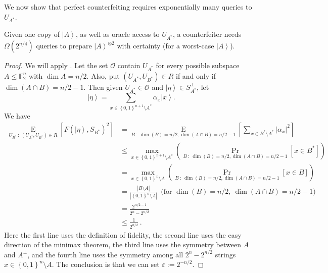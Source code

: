 We now show that perfect counterfeiting requires exponentially many queries to
$U_{A^{\ast}}$.

\begin{theorem}
\label{nocopyc}Given one copy of
$\left\vert A\right\rangle $, as well as oracle access to $U_{A^{\ast}}$, a
counterfeiter needs $\Omega(  2^{n/4})  $ queries to prepare
$\left\vert A\right\rangle ^{\otimes2}$ with certainty (for a worst-case
$\left\vert A\right\rangle $).
\end{theorem}

\begin{proof}
We will apply . Let the set $\mathcal{O}$ contain
$U_{A^{\ast}}$ for every possible subspace $A\leq\mathbb{F}_{2}^{n}$ with
$\dim A=n/2$. Also, put $\left(  U_{A^{\ast}},U_{B^{\ast}}\right)  \in
R$ if and only if $\dim\left(  A\cap B\right)  =n/2-1$. Then given
$U_{A^{\ast}}\in\mathcal{O}$ and $\left\vert \eta\right\rangle \in
S_{A^{\ast}}^{\bot}$, let%
\[
\left\vert \eta\right\rangle =\sum_{x\in\left\{  0,1\right\}  ^{n+1}\setminus
A^{\ast}}\alpha_{x}\left\vert x\right\rangle .
\]
We have%
\begin{align*}
\operatorname*{E}_{U_{B^{\ast}}~:~\left(  U_{A^{\ast}},U_{B^{\ast}}\right)
\in R}\left[  F\left(  \left\vert \eta\right\rangle ,S_{B^{\ast}}\right)
^{2}\right]   &  =\operatorname*{E}_{B~:~\dim\left(  B\right)  =n/2,\dim
\left(  A\cap B\right)  =n/2-1}\left[  \sum_{x\in B^{\ast}\setminus A^{\ast}%
}\left\vert \alpha_{x}\right\vert ^{2}\right] \\
&  \leq\max_{x\in\left\{  0,1\right\}  ^{n+1}\setminus A^{\ast}}\left(
\Pr_{B~:~\dim\left(  B\right)  =n/2,\dim\left(  A\cap B\right)  =n/2-1}\left[
x\in B^{\ast}\right]  \right) \\
&  =\max_{x\in\left\{  0,1\right\}  ^{n}\setminus A}\left(  \Pr_{B~:~\dim
\left(  B\right)  =n/2,\dim\left(  A\cap B\right)  =n/2-1}\left[  x\in
B\right]  \right) \\
&  =\frac{\left\vert B\setminus A\right\vert }{\left\vert \left\{
0,1\right\}  ^{n}\setminus A\right\vert }~~\text{(for }\dim\left(  B\right)
=n/2,~\dim\left(  A\cap B\right)  =n/2-1\text{)}\\
&  =\frac{2^{n/2-1}}{2^{n}-2^{n/2}}\\
&  \leq\frac{1}{2^{n/2}}\,.
\end{align*}
Here the first line uses the definition of fidelity, the second line uses the
easy direction of the minimax theorem, the third line uses the symmetry
between $A$ and $A^{\bot}$, and the fourth line uses the symmetry among all
$2^{n}-2^{n/2}$ strings\ $x\in\left\{  0,1\right\}  ^{n}\setminus A$. The
conclusion is that we can set $\varepsilon:=2^{-n/2}$.


\end{proof}
